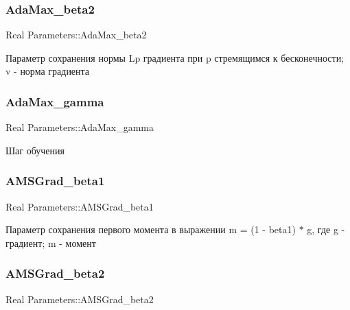 \subsubsection{\texorpdfstring{Ada\+Max\+\_\+beta2}{AdaMax\_beta2}}
{\footnotesize\ttfamily Real Parameters\+::\+Ada\+Max\+\_\+beta2\hspace{0.3cm}{\ttfamily [static]}}

Параметр сохранения нормы Lp градиента при p стремящимся к бесконечности; v -\/ норма градиента \mbox{\label{structParameters_afd6670c75d952d6e2cdc6e71e197b829}} 
\subsubsection{\texorpdfstring{Ada\+Max\+\_\+gamma}{AdaMax\_gamma}}
{\footnotesize\ttfamily Real Parameters\+::\+Ada\+Max\+\_\+gamma\hspace{0.3cm}{\ttfamily [static]}}

Шаг обучения \mbox{\label{structParameters_a8f7de16c67faf86be3a0f97987552ced}} 
\subsubsection{\texorpdfstring{A\+M\+S\+Grad\+\_\+beta1}{AMSGrad\_beta1}}
{\footnotesize\ttfamily Real Parameters\+::\+A\+M\+S\+Grad\+\_\+beta1\hspace{0.3cm}{\ttfamily [static]}}

Параметр сохранения первого момента в выражении m = (1 -\/ beta1) $\ast$ g, где g -\/ градиент; m -\/ момент \mbox{\label{structParameters_a56ae3ad51b4610d5e2fa1f9f96db1a78}} 
\subsubsection{\texorpdfstring{A\+M\+S\+Grad\+\_\+beta2}{AMSGrad\_beta2}}
{\footnotesize\ttfamily Real Parameters\+::\+A\+M\+S\+Grad\+\_\+beta2\hspace{0.3cm}{\ttfamily [static]}}

